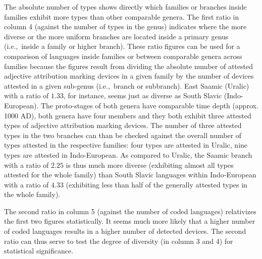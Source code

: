 The absolute number of types shows directly which families or branches inside families exhibit more types than other comparable genera. The first ratio in column 4 (against the number of types in the genus) indicates where the more diverse or the more uniform branches are located inside a primary genus (i.e.,~inside a family or higher branch). These ratio figures can be used for a comparison of languages inside families or between comparable genera across families because the figures result from dividing the absolute number of attested adjective attribution marking devices in a given family by the number of devices attested in a given sub-genus (i.e.,~branch or subbranch). East Saamic (Uralic) with a ratio of $1.33$, for instance, seems just as diverse as South Slavic (Indo-European). The proto-stages of both genera have comparable time depth (approx. 1000 AD), both genera have four members and they both exhibit three attested types of adjective attribution marking devices. The number of three attested types in the two branches can than be checked against the overall number of types attested in the respective families: four types are attested in Uralic, nine types are attested in Indo-European. As compared to Uralic, the Saamic branch with a ratio of $2.25$ is thus much more diverse (exhibiting almost all types attested for the whole family) than South Slavic languages within Indo-European with a ratio of $4.33$ (exhibiting less than half of the generally attested types in the whole family).

The second ratio in column 5 (against the number of coded languages) relativizes the first two figures statistically. It seems much more likely that a higher number of coded languages results in a higher number of detected devices. The second ratio can thus serve to test the degree of diversity (in column 3 and 4) for statistical significance. 

